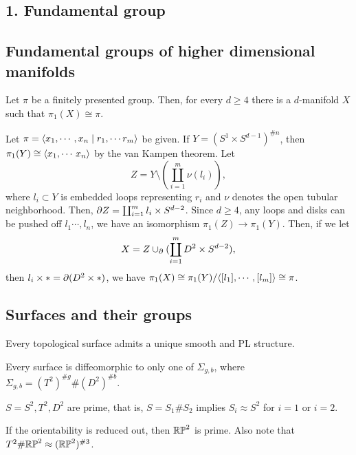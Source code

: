 \documentclass{../../../small}
\begin{document}
\subsection*{1. Fundamental group}
\subsection{Fundamental groups of higher dimensional manifolds}
\begin{prop}
Let $\pi$ be a finitely presented group.
Then, for every $d\ge4$ there is a $d$-manifold $X$ such that $\pi_1(X)\cong\pi$.
\end{prop}
\begin{pf}
Let $\pi=\langle x_1,\cdots,x_n\mid r_1,\cdots r_m\rangle$ be given.
If $Y=(S^1\times S^{d-1})^{\#n}$, then $\pi_1(Y)\cong\langle x_1,\cdots\,x_n\rangle$ by the van Kampen theorem.
Let
\[Z=Y\setminus(\coprod_{i=1}^m\nu(l_i)),\]
where $l_i\subset Y$ is embedded loops representing $r_i$ and $\nu$ denotes the open tubular neighborhood.
Then, $\pd Z=\coprod_{i=1}^ml_i\times S^{d-2}$.
Since $d\ge4$, any loops and disks can be pushed off $l_1\cdots,l_n$, we have an isomorphism $\pi_1(Z)\to\pi_1(Y)$.
Then, if we let
\[X=Z\cup_{\pd}(\coprod_{i=1}^mD^2\times S^{d-2}),\] then $l_i\times*=\pd(D^2\times*)$, we have $\pi_1(X)\cong\pi_1(Y)/\langle[l_1],\cdots,[l_m]\rangle\cong\pi$.
\end{pf}

\subsection{Surfaces and their groups}

\begin{thm}
Every topological surface admits a unique smooth and PL structure.
\end{thm}

\begin{thm}
Every surface is diffeomorphic to only one of $\Sigma_{g,b}$, where $\Sigma_{g,b}=(T^2)^{\#g}\#(D^2)^{\#b}$.
\end{thm}

\begin{cor}
$S=S^2,T^2,D^2$ are prime, that is, $S=S_1\#S_2$ implies $S_i\approx S^2$ for $i=1$ or $i=2$.
\end{cor}

\begin{rmk}
If the orientability is reduced out, then $\mathbb{RP}^2$ is prime.
Also note that $T^2\#\mathbb{RP}^2\approx(\mathbb{RP}^2)^{\#3}$.
\end{rmk}
\end{document}

